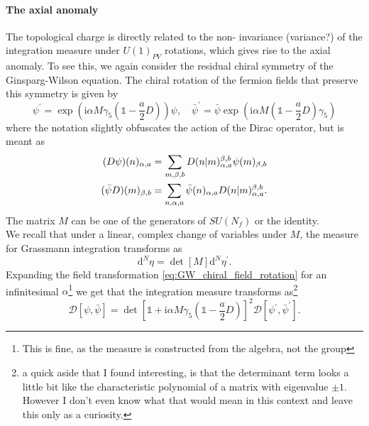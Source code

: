 \documentclass[a4paper,10pt]{article}
\begin{document}
\paragraph{The axial anomaly}
The topological charge is directly related to the  non- invariance (variance?) of the integration measure under $U(1)_{PV}$ rotations, which gives rise to the axial anomaly. To see this, we again consider the residual chiral symmetry of the Ginsparg-Wilson equation. The chiral rotation of the fermion fields that preserve this symmetry is given by
\begin{equation}
\psi^{\prime}=\exp \left(\mathrm{i} \alpha M \gamma_{5}\left(\mathbb{1}-\frac{a}{2} D\right)\right) \psi, \quad \bar{\psi}^{\prime}=\bar{\psi} \exp \left(\mathrm{i} \alpha M\left(\mathbb{1}-\frac{a}{2} D\right) \gamma_{5}\right)
\end{equation}
where the notation slightly obfuscates the action of the Dirac operator, but is meant as 
\begin{equation}\label{eq:GW_chiral_field_rotation}
\begin{aligned} 
(D \psi)(n)_{\alpha,a}&=\sum_{m, \beta, b} D(n \mkern-5mu\mid \mkern-5mu m)_{\alpha ,a}^{\beta,b} \psi(m)_{\beta,b}\\(\bar{\psi} D)(m)_{\beta,b}&=\sum_{n, \alpha, a} \bar{\psi}(n)_{\alpha,a} D(n\mkern-5mu \mid\mkern-5mu m)_{\alpha,a}^{ \beta,b}.
\end{aligned}
\end{equation}
The matrix $M$ can be one of the generators of $SU(N_f)$ or the identity.\\We recall that under a linear, complex change of variables under $M$, the measure for Grassmann integration transforms as
\begin{equation}
\mathrm{d}^{N} \eta=\operatorname{det}[M] \mathrm{d}^{N} \eta^{\prime}.
\end{equation}
Expanding the field transformation \eqref{eq:GW_chiral_field_rotation} for an infinitesimal $\alpha$\footnote{This is fine, as the measure is constructed from the algebra, not the group} we get that the integration measure transforms as\footnote{a quick aside that I found interesting, is that the determinant term looks a little bit like the characteristic polynomial of a matrix with eigenvalue $\pm 1$. However I don't even know what that would mean in this context and leave this only as a curiosity.}
\begin{equation}
\mathcal{D}[\psi, \bar{\psi}]= \operatorname{det}\left[\mathbb{1}+\mathrm{i} \alpha M \gamma_{5}\left(\mathbb{1}-\frac{a}{2} D\right)\right]^{2}\mathcal{D}\left[\psi^{\prime}, \bar{\psi}^{\prime}\right].
\end{equation}
\end{document}
